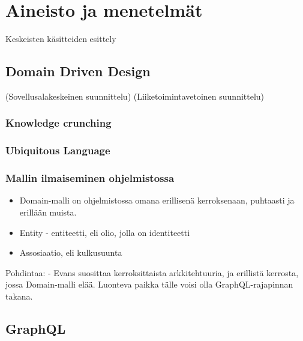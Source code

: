\vspace{21.5pt}

\hypertarget{aineisto-ja-menetelmuxe4t}{%
\section{Aineisto ja menetelmät}\label{aineisto-ja-menetelmuxe4t}}

Keskeisten käsitteiden esittely

\hypertarget{domain-driven-design}{%
\subsection{Domain Driven Design}\label{domain-driven-design}}

(Sovellusalakeskeinen suunnittelu) (Liiketoimintavetoinen suunnittelu)

\hypertarget{knowledge-crunching}{%
\subsubsection{Knowledge crunching}\label{knowledge-crunching}}

\hypertarget{ubiquitous-language}{%
\subsubsection{Ubiquitous Language}\label{ubiquitous-language}}

\hypertarget{mallin-ilmaiseminen-ohjelmistossa}{%
\subsubsection{Mallin ilmaiseminen
ohjelmistossa}\label{mallin-ilmaiseminen-ohjelmistossa}}

\begin{itemize}
\tightlist
\item
  Domain-malli on ohjelmistossa omana erillisenä kerroksenaan, puhtaasti
  ja erillään muista.
\item
  Entity - entiteetti, eli olio, jolla on identiteetti
\item
  Assosiaatio, eli kulkusuunta
\end{itemize}

Pohdintaa: - Evans suosittaa kerroksittaista arkkitehtuuria, ja
erillistä kerrosta, jossa Domain-malli elää. Luonteva paikka tälle voisi
olla GraphQL-rajapinnan takana.

\hypertarget{graphql}{%
\subsection{GraphQL}\label{graphql}}

